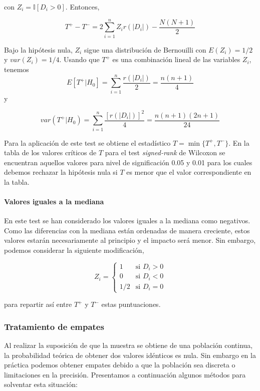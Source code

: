 	 con $ Z_i = \mathbb{I}[ D_i > 0 ]$. Entonces,
	 		
	\[ T^+  - T^- = 2 \sum\limits_{i=1}^n
					 Z_i r(|D_i|) - \frac{N(N+1)}{2} \]
	
	Bajo la hipótesis nula, $Z_i$ sigue una distribución de 
Bernouilli con $E(Z_i) = 1/2$ y $var(Z_i) = 1/4$. Usando que 
$T^+$ es una combinación lineal de las variables $Z_i$, 
tenemos
	\[ E[ T^+ | H_0 ] = \sum\limits_{i=1}^n 
						\frac{r(|D_i|)}{2} 
					= \frac{n(n+1)}{4}			\]
	y
	
	\[ var( T^+ | H_0 ) = \sum\limits_{i=1}^n 
						\frac{[r(|D_i|)]^2}{4} 
					= \frac{n(n+1)(2n+1)}{24}	\]
					
	Para la aplicación de este test se obtiene el estadístico 
$T = \min \{ T^+, T^- \}$. En la tabla de los valores 
críticos de $T$ para el test \textit{signed-rank} de Wilcoxon 
\cite[Tabla A5]{SHESKIN11} se encuentran aquellos valores 
para nivel de significación 0.05 y 0.01 para los cuales 
debemos rechazar la hipótesis nula si $T$ es menor que el 
valor correspondiente en la tabla.\\
	
\paragraph{Valores iguales a la mediana} En este test se han 
considerado los valores iguales a la mediana como negativos. 
Como las diferencias con la mediana están ordenadas de manera 
creciente, estos valores estarán necesariamente al principio 
y el impacto será menor. Sin embargo, podemos considerar la 
siguiente modificación,

	\[ Z_i = \left\lbrace \begin{array}{ll}
	 				1 & \text{si } D_i > 0 \\
	 				0 & \text{si } D_i < 0 \\
	 				1/2 & \text{si } D_i = 0 
	 		\end{array} \right. 					\]
	
	para repartir así entre $T^+$ y $T^-$ estas puntuaciones. 
	
\subsubsection{Tratamiento de empates}
	
	Al realizar la suposición de que la muestra se obtiene de 
una población continua, la probabilidad teórica de obtener 
dos valores idénticos es nula. Sin embargo en la práctica 
podemos obtener empates debido a que la población sea 
discreta o limitaciones en la precisión. Presentamos a 
continuación algunos métodos para solventar esta situación:
	
